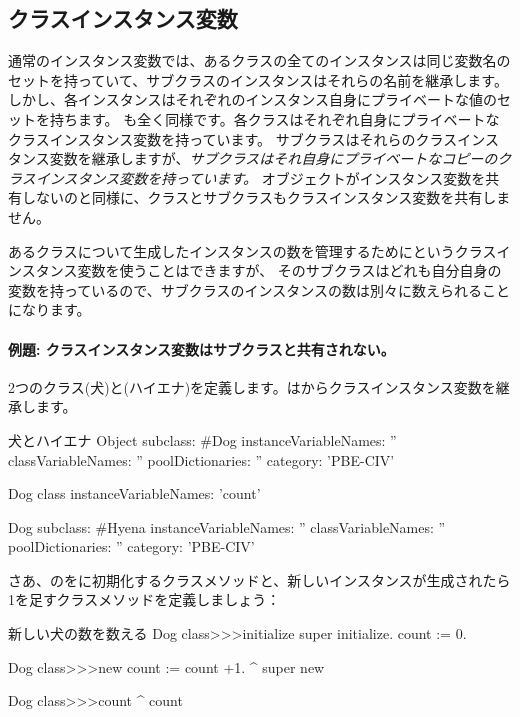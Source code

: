 \documentclass[a4paper,10pt,twoside]{book}
\begin{document}
\subsection{クラスインスタンス変数}
通常のインスタンス変数では、あるクラスの全てのインスタンスは同じ変数名のセットを持っていて、サブクラスのインスタンスはそれらの名前を継承します。しかし、各インスタンスはそれぞれのインスタンス自身にプライベートな値のセットを持ちます。
も全く同様です。各クラスはそれぞれ自身にプライベートなクラスインスタンス変数を持っています。
サブクラスはそれらのクラスインスタンス変数を継承しますが、\emph{サブクラスはそれ自身にプライベートなコピーのクラスインスタンス変数を持っています。}
オブジェクトがインスタンス変数を共有しないのと同様に、クラスとサブクラスもクラスインスタンス変数を共有しません。

あるクラスについて生成したインスタンスの数を管理するためにというクラスインスタンス変数を使うことはできますが、
そのサブクラスはどれも自分自身の変数を持っているので、サブクラスのインスタンスの数は別々に数えられることになります。

\paragraph{例題: クラスインスタンス変数はサブクラスと共有されない。}
2つのクラス(犬)と(ハイエナ)を定義します。はからクラスインスタンス変数を継承します。

\begin{classdef}[dog]{犬とハイエナ}
Object subclass: #Dog
	instanceVariableNames: ''
	classVariableNames: ''
	poolDictionaries: ''
	category: 'PBE-CIV'

Dog class
	instanceVariableNames: 'count'

Dog subclass: #Hyena
	instanceVariableNames: ''
	classVariableNames: ''
	poolDictionaries: ''
	category: 'PBE-CIV'
\end{classdef}

さあ、のをに初期化するクラスメソッドと、新しいインスタンスが生成されたら1を足すクラスメソッドを定義しましょう：

\begin{method}[dogcount]{新しい犬の数を数える}
Dog class>>>initialize
	super initialize.
	count := 0.

Dog class>>>new
	count := count +1.
	^ super new

Dog class>>>count
	^ count
\end{method}
\end{document}
